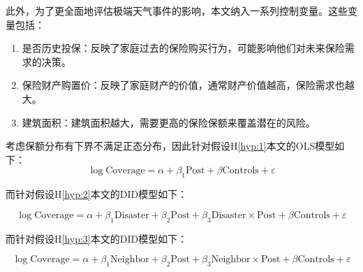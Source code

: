 此外，为了更全面地评估极端天气事件的影响，本文纳入一系列控制变量。这些变量包括：
\begin{enumerate}
    \item 是否历史投保：反映了家庭过去的保险购买行为，可能影响他们对未来保险需求的决策。
    \item 保险财产购置价：反映了家庭财产的价值，通常财产价值越高，保险需求也越大。
    \item 建筑面积：建筑面积越大，需要更高的保险保额来覆盖潜在的风险。
\end{enumerate}



考虑保额分布有下界不满足正态分布，因此针对假设H\ref{hyp:1}本文的OLS模型如下：
\begin{equation}
    \log\text{Coverage}=\alpha+\beta_1\text{Post}+\beta\text{Controls}+\varepsilon
    \label{eq:OLS}
\end{equation}

而针对假设H\ref{hyp:2}本文的DID模型如下：

\begin{equation}
    \log\text{Coverage}=\alpha+\beta_1\text{Disaster}+\beta_2\text{Post}+\beta_3\text{Disaster}\times\text{Post}+\beta\text{Controls}+\varepsilon
    \label{eq:DID_1}
\end{equation}

而针对假设H\ref{hyp:3}本文的DID模型如下：

\begin{equation}
    \log\text{Coverage}=\alpha+\beta_1\text{Neighbor}+\beta_2\text{Post}+\beta_3\text{Neighbor}\times\text{Post}+\beta\text{Controls}+\varepsilon
    \label{eq:DID_2}
\end{equation}

